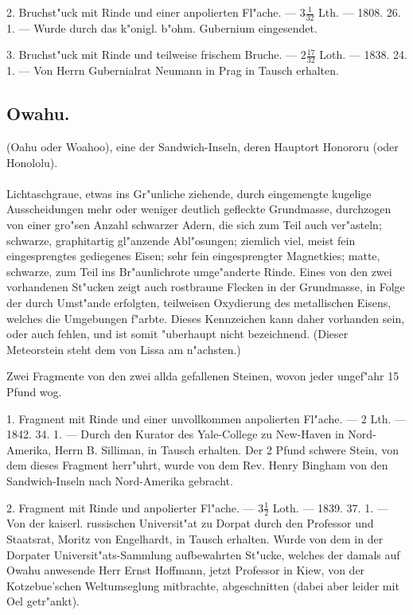 \documentclass[a4paper, 11pt, oneside, polutonikogreek, german]{article}
\begin{document}
2. Bruchst"uck mit Rinde und einer anpolierten Fl"ache. --- $3\frac{1}{32}$ Lth. --- 1808. 26. 1. --- Wurde durch das k"onigl. b"ohm. Gubernium eingesendet.

3. Bruchst"uck mit Rinde und teilweise frischem Bruche. --- $2\frac{17}{32}$ Loth. --- 1838. 24. 1. --- Von Herrn Gubernialrat Neumann in Prag in Tausch erhalten.
\subsection{Owahu.}
\begin{center}
\small
(Oahu oder Woahoo), eine der Sandwich-Inseln, deren Hauptort Honororu (oder Honololu).
\end{center}
\paragraph{}
Lichtaschgraue, etwas ins Gr"unliche ziehende, durch eingemengte kugelige Ausscheidungen mehr oder weniger deutlich gefleckte Grundmasse, durchzogen von einer gro"sen Anzahl schwarzer Adern, die sich zum Teil auch ver"asteln; schwarze, graphitartig gl"anzende Abl"osungen; ziemlich viel, meist fein eingesprengtes gediegenes Eisen; sehr fein eingesprengter Magnetkies; matte, schwarze, zum Teil ins Br"aunlichrote umge"anderte Rinde. Eines von den zwei vorhandenen St"ucken zeigt auch rostbraune Flecken in der Grundmasse, in Folge der durch Umst"ande erfolgten, teilweisen Oxydierung des metallischen Eisens, welches die Umgebungen f"arbte. Dieses Kennzeichen kann daher vorhanden sein, oder auch fehlen, und ist somit "uberhaupt nicht bezeichnend. (Dieser Meteorstein steht dem von Lissa am n"achsten.)

Zwei Fragmente von den zwei allda gefallenen Steinen, wovon jeder ungef"ahr 15 Pfund wog.

1. Fragment mit Rinde und einer unvollkommen anpolierten Fl"ache. --- 2 Lth. --- 1842. 34. 1. --- Durch den Kurator des Yale-College zu New-Haven in Nord-Amerika, Herrn B. Silliman, in Tausch erhalten. Der 2 Pfund schwere Stein, von dem dieses Fragment herr"uhrt, wurde von dem Rev. Henry Bingham von den Sandwich-Inseln nach Nord-Amerika gebracht.

2. Fragment mit Rinde und anpolierter Fl"ache. --- $3\frac{1}{2}$ Loth. --- 1839. 37. 1. --- Von der kaiserl. russischen Universit"at zu Dorpat durch den Professor und Staatsrat, Moritz von Engelhardt, in Tausch erhalten. Wurde von dem in der Dorpater Universit"ats-Sammlung aufbewahrten St"ucke, welches der damals auf Owahu anwesende Herr Ernst Hoffmann, jetzt Professor in Kiew, von der Kotzebue'schen Weltumseglung mitbrachte, abgeschnitten (dabei aber leider mit Oel getr"ankt).
\end{document}

